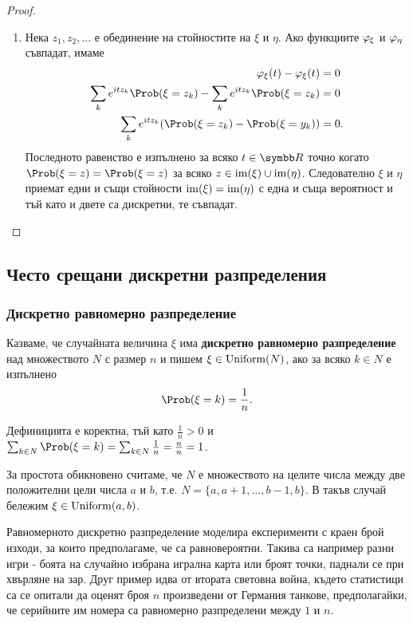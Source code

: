 \documentclass[numbers=endperiod, bibliography=totocnumbered]{scrartcl}
\begin{document}
\begin{proof}
\begin{enumerate}
    \item Нека \( z_1, z_2, \ldots \) е обединение на стойностите на \( \xi \) и \( \eta \). Ако функциите \( \varphi_\xi \) и \( \varphi_\eta \) съвпадат, имаме
    \begin{align*}
      \Char_\xi(t) - \Char_\xi(t) &= 0
      \\
      \sum_k e^{i t z_k} \Prob(\xi = z_k) - \sum_k e^{i t z_k} \Prob(\xi = z_k) &= 0
      \\
      \sum_k e^{i t z_k} (\Prob(\xi = z_k) - \Prob(\xi = y_k)) &= 0.
    \end{align*}
    Последното равенство е изпълнено за всяко \( t \in \R \) точно когато \( \Prob(\xi = z) = \Prob(\xi = z) \) за всяко \( z \in \operatorname{im}(\xi) \cup \operatorname{im}(\eta) \). Следователно \( \xi \) и \( \eta \) приемат едни и същи стойности \( \operatorname{im}(\xi) = \operatorname{im}(\eta) \) с една и съща вероятност и тъй като и двете са дискретни, те съвпадат.
  \end{enumerate}
\end{proof}

\subsection{Често срещани дискретни разпределения}

\subsubsection{Дискретно равномерно разпределение}\label{dist:unif}

\begin{definition}
  Казваме, че случайната величина \( \xi \) има \textbf{дискретно равномерно разпределение} над множеството \( N \) с размер \( n \) и пишем \( \xi \in \operatorname{Uniform}(N) \), ако за всяко \( k \in N \) е изпълнено
  \begin{equation*}
    \Prob(\xi = k) = \frac 1 n.
  \end{equation*}

  Дефиницията е коректна, тъй като \( \frac 1 n > 0 \) и \( \sum_{k \in N} \Prob(\xi = k) = \sum_{k \in N} \frac 1 n = \frac n n = 1 \).

  За простота обикновено считаме, че \( N \) е множеството на целите числа между две положителни цели числа \( a \) и \( b \), т.е. \( N = \{ a, a + 1, \ldots, b - 1, b \} \). В такъв случай бележим \( \xi \in \operatorname{Uniform}(a, b) \).
\end{definition}

Равномерното дискретно разпределение моделира експерименти с краен брой изходи, за които предполагаме, че са равновероятни. Такива са например разни игри - боята на случайно избрана игрална карта или броят точки, паднали се при хвърляне на зар. Друг пример идва от втората световна война, където статистици са се опитали да оценят броя \( n \) произведени от Германия танкове, предполагайки, че серийните им номера са равномерно разпределени между \( 1 \) и \( n \).
\end{document}
